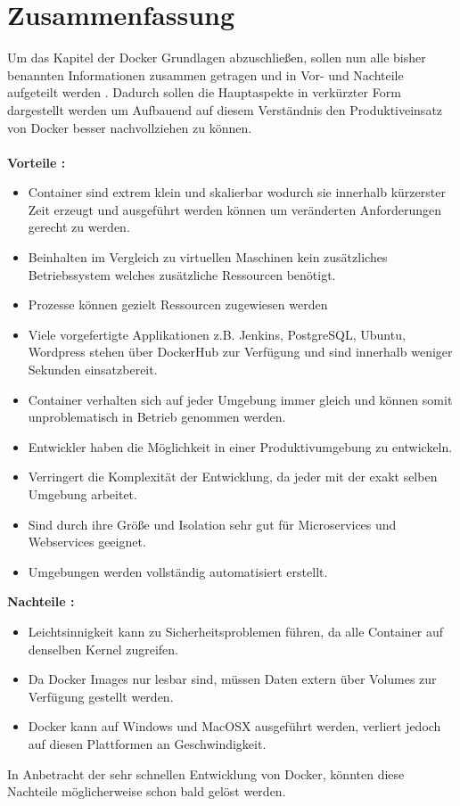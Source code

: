 \documentclass[12pt,toc=bib,toc=listof]{scrreprt}
\begin{document}
\section{Zusammenfassung}

Um das Kapitel der Docker Grundlagen abzuschließen, sollen nun alle bisher benannten Informationen zusammen getragen und in Vor- und Nachteile aufgeteilt werden . Dadurch sollen die Hauptaspekte in verkürzter Form dargestellt werden um Aufbauend auf diesem Verständnis den Produktiveinsatz von Docker besser nachvollziehen zu können.\\
\\
\textbf{Vorteile :}

\begin{itemize}
	\item Container sind extrem klein und skalierbar wodurch sie innerhalb kürzerster Zeit erzeugt und ausgeführt werden können um veränderten Anforderungen gerecht zu werden.
	\item Beinhalten im Vergleich zu virtuellen Maschinen kein zusätzliches Betriebssystem welches zusätzliche Ressourcen benötigt.
	\item Prozesse können gezielt Ressourcen zugewiesen werden
	\item Viele vorgefertigte Applikationen z.B. Jenkins, PostgreSQL, Ubuntu, Wordpress stehen über DockerHub zur Verfügung und sind innerhalb weniger Sekunden einsatzbereit.
	\item Container verhalten sich auf jeder Umgebung immer gleich und können somit unproblematisch in Betrieb genommen werden.
	\item Entwickler haben die Möglichkeit in einer Produktivumgebung zu entwickeln.
	\item Verringert die Komplexität der Entwicklung, da jeder mit der exakt selben Umgebung arbeitet.
	\item Sind durch ihre Größe und Isolation sehr gut für Microservices und Webservices geeignet.
	\item Umgebungen werden vollständig automatisiert erstellt.
\end{itemize}
\textbf{Nachteile :}
\begin{itemize}
	\item Leichtsinnigkeit kann zu Sicherheitsproblemen führen, da alle Container auf denselben Kernel zugreifen.
	\item Da Docker Images nur lesbar sind, müssen Daten extern über Volumes zur Verfügung gestellt werden.
	\item Docker kann auf Windows und MacOSX ausgeführt werden, verliert jedoch auf diesen Plattformen an Geschwindigkeit.
\end{itemize}
In Anbetracht der sehr schnellen Entwicklung von Docker, könnten diese Nachteile möglicherweise schon bald gelöst werden.
\end{document}

